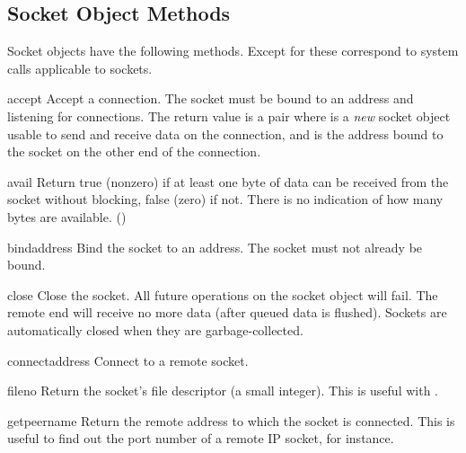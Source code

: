 \subsection{Socket Object Methods}

\noindent
Socket objects have the following methods.  Except for
 these correspond to \UNIX{} system calls applicable to
sockets.

\renewcommand{\indexsubitem}{(socket method)}
\begin{funcdesc}{accept}{}
Accept a connection.
The socket must be bound to an address and listening for connections.
The return value is a pair 
where  is a \emph{new} socket object usable to send and
receive data on the connection, and  is the address bound
to the socket on the other end of the connection.
\end{funcdesc}

\begin{funcdesc}{avail}{}
Return true (nonzero) if at least one byte of data can be received
from the socket without blocking, false (zero) if not.  There is no
indication of how many bytes are available.  ()
\end{funcdesc}

\begin{funcdesc}{bind}{address}
Bind the socket to an address.  The socket must not already be bound.
\end{funcdesc}

\begin{funcdesc}{close}{}
Close the socket.  All future operations on the socket object will fail.
The remote end will receive no more data (after queued data is flushed).
Sockets are automatically closed when they are garbage-collected.
\end{funcdesc}

\begin{funcdesc}{connect}{address}
Connect to a remote socket.
\end{funcdesc}

\begin{funcdesc}{fileno}{}
Return the socket's file descriptor (a small integer).  This is useful
with .
\end{funcdesc}

\begin{funcdesc}{getpeername}{}
Return the remote address to which the socket is connected.  This is
useful to find out the port number of a remote IP socket, for instance.
\end{funcdesc}

